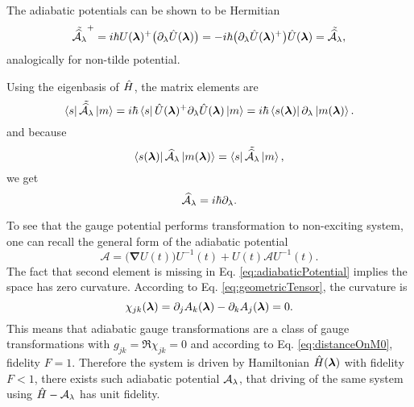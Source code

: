 The adiabatic potentials can be shown to be Hermitian
\begin{equation}
     \tilde{\AA_\lambda}^+=i\hbar U(\llambda)^+\big(\partial_\lambda\U(\llambda)\big)=-i\hbar\big(\partial_\lambda\U(\llambda)^+\big)\U(\llambda) = \tilde{\AA_\lambda},
     \label{eq:counterdiabaticPotentialTwoSystems}
\end{equation}
analogically for non-tilde potential.

Using the eigenbasis of $\hat{H}$, the matrix elements are
\begin{equation}
    \bra{s}\tilde{\mathcal{\widehat{A}}_\lambda}\ket{m}=i\hbar\bra{s}\hat{U}({\bm\lambda})^+\partial_\lambda\hat{U}({\bm\lambda})\ket{m} = i\hbar\bra{s({\bm\lambda})}\partial_\lambda\ket{m({\bm\lambda})}.
\end{equation}
and because
\begin{equation}
    \bra{s({\bm\lambda})}\mathcal{\widehat{A}}_\lambda\ket{ m({\bm\lambda})}= \bra{s}\tilde{\mathcal{\widehat{A}}_\lambda}\ket{m},
\end{equation}
we get
\begin{equation}
    \AA_\lambda = i\hbar\partial_\lambda.
    \label{eq:adiabaticPotentialDefinition}
\end{equation}


To see that the gauge potential performs transformation to non-exciting system, one can recall the general form of the adiabatic potential
\begin{equation}
    \bm{\mathcal A}=\big(\bm\nabla U(t)\big)U^{-1}(t) + U(t) \bm{\mathcal A} U^{-1}(t).
\end{equation}
The fact that second element is missing in Eq. \ref{eq:adiabaticPotential} implies the space has zero curvature. According to Eq. \ref{eq:geometricTensor}, the curvature is
\begin{equation}
    \chi_{jk}({\bm\lambda}) = \partial_j A_k({\bm\lambda})-\partial_k A_j({\bm\lambda}) = 0.
\end{equation}
This means that adiabatic gauge transformations are a class of gauge transformations with $g_{jk}=\Re\chi_{jk}=0$ and according to Eq. \ref{eq:distanceOnM0}, fidelity $F=1$. Therefore the system is driven by Hamiltonian $\hat{H}({\bm\lambda})$ with fidelity $F<1$, there exists such adiabatic potential $\mathcal{A}_\lambda$, that driving of the same system using $\hat{H}-\mathcal{A}_\lambda$ has unit fidelity.

